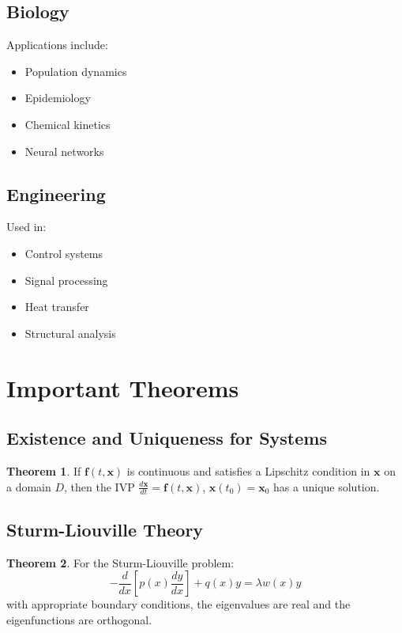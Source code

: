 \documentclass[11pt]{article}
\theoremstyle{definition}
\newtheorem{theorem}{Theorem}[section]
\begin{document}
\subsection{Biology}
Applications include:
\begin{itemize}
    \item Population dynamics
    \item Epidemiology
    \item Chemical kinetics
    \item Neural networks
\end{itemize}

\subsection{Engineering}
Used in:
\begin{itemize}
    \item Control systems
    \item Signal processing
    \item Heat transfer
    \item Structural analysis
\end{itemize}

\section{Important Theorems}

\subsection{Existence and Uniqueness for Systems}
\begin{theorem}
If $\mathbf{f}(t,\mathbf{x})$ is continuous and satisfies a Lipschitz condition in $\mathbf{x}$ on a domain $D$, then the IVP $\frac{d\mathbf{x}}{dt} = \mathbf{f}(t,\mathbf{x})$, $\mathbf{x}(t_0) = \mathbf{x}_0$ has a unique solution.
\end{theorem}

\subsection{Sturm-Liouville Theory}
\begin{theorem}
For the Sturm-Liouville problem:
$$-\frac{d}{dx}\left[p(x)\frac{dy}{dx}\right] + q(x)y = \lambda w(x)y$$
with appropriate boundary conditions, the eigenvalues are real and the eigenfunctions are orthogonal.
\end{theorem}
\end{document}
